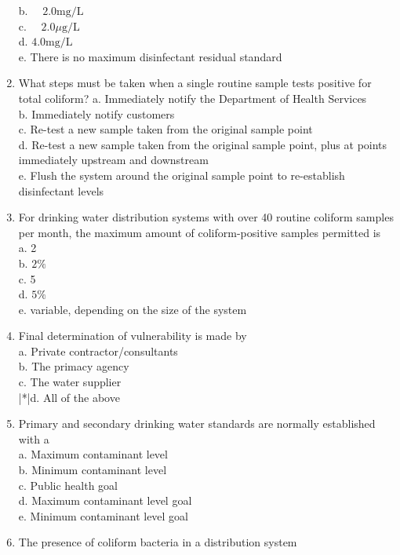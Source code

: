 \begin{enumerate}
b. $\quad 2.0 \mathrm{mg} / \mathrm{L}$\\
c. $\quad 2.0 \mu \mathrm{g} / \mathrm{L}$\\
d. $4.0 \mathrm{mg} / \mathrm{L}$\\
e. There is no maximum disinfectant residual standard\\
\item What steps must be taken when a single routine sample tests positive for total coliform? a. Immediately notify the Department of Health Services\\
b. Immediately notify customers\\
c. Re-test a new sample taken from the original sample point\\
d. Re-test a new sample taken from the original sample point, plus at points immediately upstream and downstream\\
e. Flush the system around the original sample point to re-establish disinfectant levels\\
\item For drinking water distribution systems with over 40 routine coliform samples per month, the maximum amount of coliform-positive samples permitted is\\
a. 2\\
b. $2 \%$\\
c. 5\\
d. $5 \%$\\
e. variable, depending on the size of the system\\
\item Final determination of vulnerability is made by\\
a. Private contractor/consultants\\
b. The primacy agency\\
c. The water supplier\\
|*|d. All of the above\\
\item Primary and secondary drinking water standards are normally established with a\\
a. Maximum contaminant level\\
b. Minimum contaminant level\\
c. Public health goal\\
d. Maximum contaminant level goal\\
e. Minimum contaminant level goal\\
\item The presence of coliform bacteria in a distribution system\\

\end{enumerate}
